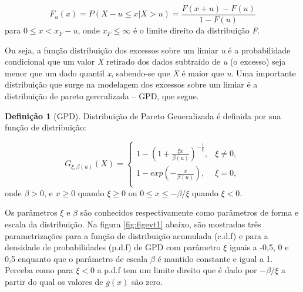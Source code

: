 \documentclass[review]{elsarticle}
\theoremstyle{definition}
\newtheorem{defi}[teor]{Definição}
\begin{document}
\begin{equation}
\label{eq:excessdist}
F_u(x)=P(X-u \leq x | X > u)=\frac{F(x+u)-F(u)}{1-F(u)}
\end{equation}
para $0 \leq x < x_F-u$, onde $x_F \leq \infty$ é o limite direito da distribuição \emph{F}.

Ou seja, a função distribuição dos excessos sobre um limiar \emph{u} é a probabilidade condicional que um valor \emph{X} retirado dos dados subtraído de \emph{u} (o excesso) seja menor que um dado quantil \emph{x}, sabendo-se que \emph{X} é maior que \emph{u}. 
Uma importante distribuição que surge na modelagem dos excessos sobre um limiar é a distribuição de pareto gereralizada – GPD, que segue.

\begin{defi}[GPD] \label{defi:GPD}
	Distribuição de Pareto Generalizada é definida por sua função de distribuição:
\end{defi}

\begin{equation}
\label{eq:GPD}
G_{\xi,\beta(u)}(X) = 
\begin{cases}
1- \left(1+ \frac{\xi x}{\beta(u)} \right)^{-\frac{1}{\xi}}, & \xi \neq 0,\\
1-exp\left(-\frac{x}{\beta(u)}\right), & \xi = 0,\\
\end{cases}
\end{equation}
onde $\beta > 0$, e $x\geq 0$ quando $\xi  \geq 0$ ou $0 \leq x \leq -\beta / \xi$ quando $\xi < 0$.

Os parâmetros $\xi$ e $\beta$ são conhecidos respectivamente como parâmetros de forma e escala da distribuição. Na figura \ref{fig:figevt1} abaixo, são mostradas três parametrizações para a função de distribuição acumulada (c.d.f) e para a densidade de probabilidades (p.d.f) de GPD com parâmetro $\xi$ iguais a -0,5, 0 e 0,5 enquanto que o parâmetro de escala $\beta$ é mantido constante e igual a 1. Perceba como para $\xi <0$ a p.d.f tem um limite direito que é dado por $-\beta / \xi$ a partir do qual os valores de $g(x)$ são zero.
\end{document}
